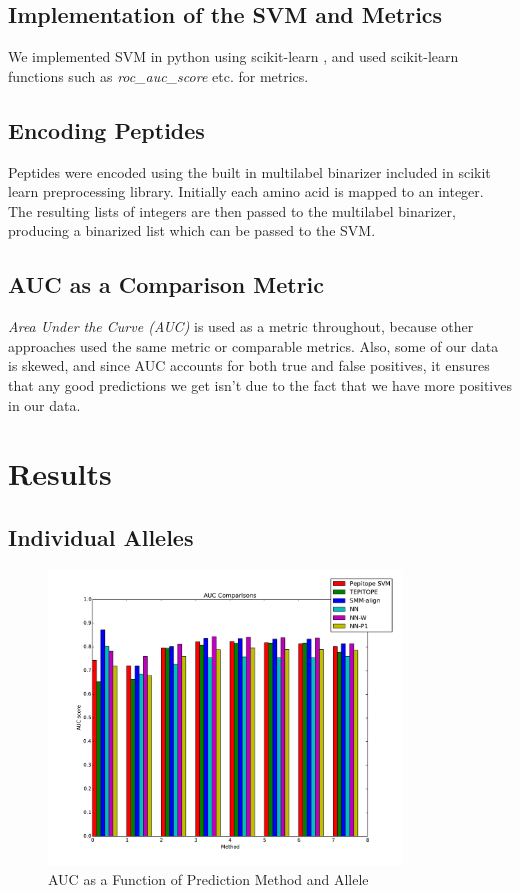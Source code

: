 \documentclass[journal]{IEEEtran}
\begin{document}
\subsection{Implementation of the SVM and Metrics}
We implemented SVM in python using scikit-learn \cite{ScikitLearn}, and used scikit-learn functions such as \textit{roc\_auc\_score} etc. for metrics.

\subsection{Encoding Peptides}
Peptides were encoded using the built in multilabel binarizer included in scikit learn preprocessing library.  Initially each amino acid is mapped to an integer.  The resulting lists of integers are then passed to the multilabel binarizer, producing a binarized list which can be passed to the SVM.


\subsection{AUC as a Comparison Metric} 
\textit{Area Under the Curve (AUC)} is used as a metric throughout, because other approaches used the same metric or comparable metrics. Also, some of our data is skewed, and since AUC accounts for both true and false positives, it ensures that any good predictions we get isn't due to the fact that we have more positives in our data.


\section{Results}

\subsection{Individual Alleles}

\begin{figure}[!t]
\centering
\includegraphics[width=3.7in]{individual}
\caption{AUC as a Function of Prediction Method and Allele}
\label{fig_sim}
\end{figure}
\end{document}
